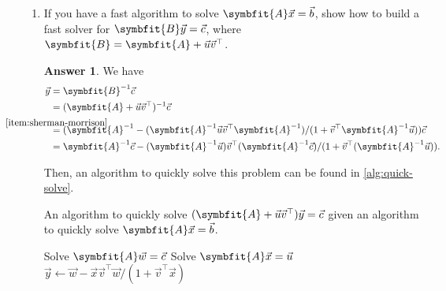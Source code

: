 \documentclass{article}
\theoremstyle{definition}
\newtheorem*{answer}{Answer}
\newcommand{\mat}[1]{\symbfit{#1}}
\begin{document}
\begin{enumerate}[leftmargin=\labelsep]
\begin{enumerate}
		      \item If you have a fast algorithm to solve \(\mat{A}\vec{x} = \vec{b}\), show how to build a fast solver for \(\mat{B}\vec{y} = \vec{c}\), where \(\mat{B} = \mat{A} + \vec{u}\vec{v}^\top\).
		            \begin{answer}
			            We have
			            \begin{align*}
				            \vec{y} & = \mat{B}^{-1} \vec{c}                                                                                                                                              \\
				                    & = (\mat{A} + \vec{u}\vec{v}^\top)^{-1} \vec{c}                                                                                                                      \\
				                    & \stackrel{\mathclap{\ref{item:sherman-morrison}}}{=} (\mat{A}^{-1} - (\mat{A}^{-1}\vec{u}\vec{v}^\top\mat{A}^{-1})/(1 + \vec{v}^\top \mat{A}^{-1} \vec{u})) \vec{c} \\
				                    & = \mat{A}^{-1}\vec{c} - (\mat{A}^{-1}\vec{u})\vec{v}^\top(\mat{A}^{-1}\vec{c})/(1 + \vec{v}^\top (\mat{A}^{-1} \vec{u})).
			            \end{align*}

			            Then, an algorithm to quickly solve this problem can be found in \cref{alg:quick-solve}.
			            \begin{algorithm}
				            \caption{An algorithm to quickly solve \((\mat{A} + \vec{u}\vec{v}^\top)\vec{y} = \vec{c}\) given an algorithm to quickly solve \(\mat{A}\vec{x} = \vec{b}\).}
				            \label{alg:quick-solve}
				            \KwData{\(\mat{A},\ \vec{c},\ \vec{u},\ \vec{v}\)}
				            \KwResult{\(\vec{y} = (\mat{A} + \vec{u}\vec{v}^\top)^{-1}\vec{c}\)}
				            Solve \(\mat{A}\vec{w} = \vec{c}\)\;
				            Solve \(\mat{A}\vec{x} = \vec{u}\)\;
				            \(\vec{y} \gets \vec{w} - \vec{x}\vec{v}^\top\vec{w}/(1 + \vec{v}^\top \vec{x})\)\;
			            \end{algorithm}

		            \end{answer}

	      \end{enumerate}


\end{enumerate}
\end{document}
